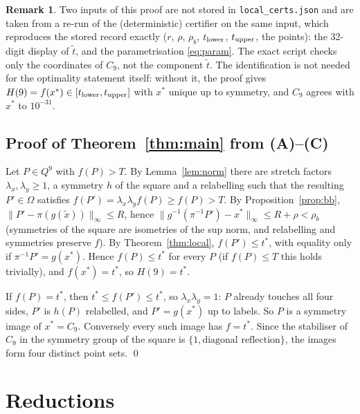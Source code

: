 \documentclass[11pt]{amsart}
\theoremstyle{definition}
\newtheorem{remark}[theorem]{Remark}
\newcommand{\tstar}{t^{*}}
\begin{document}
\begin{remark}\label{rem:ident}
Two inputs of this proof are not stored in \texttt{local\_certs.json} and are taken from a re-run of the (deterministic) certifier on the same input, which reproduces the stored record exactly ($r$, $\rho$, $\rho_b$, $t_{\rm lower}$, $t_{\rm upper}$, the points): the 32-digit display of $\tilde t$, and the parametrisation \eqref{eq:param}. The exact script checks only the coordinates of $C_9$, not the component $\tilde t$. The identification is not needed for the optimality statement itself: without it, the proof gives $H(9) = f(x^*) \in [t_{\rm lower}, t_{\rm upper}]$ with $x^*$ unique up to symmetry, and $C_9$ agrees with $x^*$ to $10^{-31}$.
\end{remark}

\subsection{Proof of Theorem~\ref{thm:main} from (A)--(C)}
Let $P \in Q^9$ with $f(P) > T$. By Lemma~\ref{lem:norm} there are stretch factors $\lambda_x,\lambda_y \ge 1$, a symmetry $h$ of the square and a relabelling such that the resulting $P' \in \Omega$ satisfies $f(P') = \lambda_x\lambda_y f(P) \ge f(P) > T$. By Proposition~\ref{prop:bb}, $\|P' - \pi(g(\tilde x))\|_\infty \le R$, hence $\|g^{-1}(\pi^{-1}P') - x^*\|_\infty \le R + \rho < \rho_b$ (symmetries of the square are isometries of the sup norm, and relabelling and symmetries preserve $f$). By Theorem~\ref{thm:local}, $f(P') \le \tstar$, with equality only if $\pi^{-1}P' = g(x^*)$. Hence $f(P) \le \tstar$ for every $P$ (if $f(P) \le T$ this holds trivially), and $f(x^*) = \tstar$, so $H(9) = \tstar$.

If $f(P) = \tstar$, then $\tstar \le f(P') \le \tstar$, so $\lambda_x\lambda_y = 1$: $P$ already touches all four sides, $P'$ is $h(P)$ relabelled, and $P' = g(x^*)$ up to labels. So $P$ is a symmetry image of $x^* = C_9$. Conversely every such image has $f = \tstar$. Since the stabiliser of $C_9$ in the symmetry group of the square is $\{1, \text{diagonal reflection}\}$, the images form four distinct point sets. \qed

\section{Reductions}\label{sec:reductions}
\end{document}
